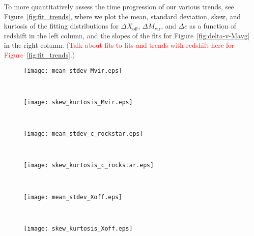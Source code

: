 To more quantitatively assess the time progression of our various trends, see Figure~\ref{fig:fit_trends}, where we plot the mean, standard deviation, skew, and kurtosis of the fitting distributions for $\Delta X_{\mathrm{off}}$, $\Delta M_{\mathrm{vir}}$, and $\Delta c$ as a function of redshift in the left column, and the slopes of the fits for Figure~\ref{fig:delta-v-Mavg} in the right column.  \textcolor{red}{(Talk about fits to fits and trends with redshift here for Figure~\ref{fig:fit_trends}.)}

\begin{figure*}[t]
	\centering
	\begin{subfigure}{}
		\texttt{[image: mean\_stdev\_Mvir.eps]}
	\end{subfigure}
	~
	\begin{subfigure}{}
		\texttt{[image: skew\_kurtosis\_Mvir.eps]}
	\end{subfigure}
	\\
	\begin{subfigure}{}
		\texttt{[image: mean\_stdev\_c\_rockstar.eps]}
	\end{subfigure}
	~
	\begin{subfigure}{}
		\texttt{[image: skew\_kurtosis\_c\_rockstar.eps]}
	\end{subfigure}
	\\
	\begin{subfigure}{}
		\texttt{[image: mean\_stdev\_Xoff.eps]}
	\end{subfigure}
	~
	\begin{subfigure}{}
		\texttt{[image: skew\_kurtosis\_Xoff.eps]}
	\end{subfigure}
	\caption[Statistics for Gaussian fits]{\footnotesize \textcolor{red}{Expand caption.}  \emph{Left column:}  Mean and standard deviation (top panel), and skew and kurtosis (bottom panel) of the generalized normal distribution fits as a function of redshift for histograms in Figure~\ref{fig:diff-hist_Xoff} and Figure~\ref{fig:diff-hist_Mvir_c}.  In the top panel, the points have been offset slightly from each other in redshift to avoid overlap.  \emph{Right column:}  Slope of fits as a function of redshift for $\Delta M_{\mathrm{vir}}$ (top panel) and $\Delta c$ (bottom panel) from Figure~\ref{fig:delta-v-Mavg}.}
	\label{fig:fit_trends}
\end{figure*}

